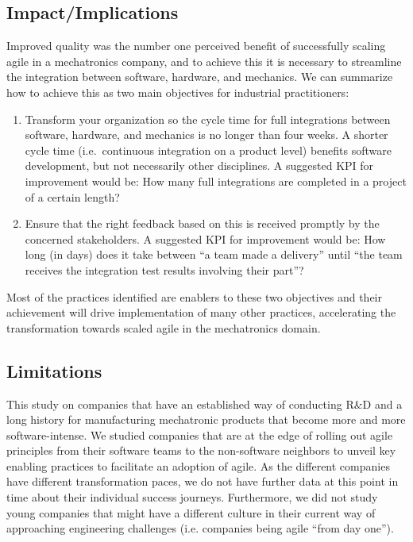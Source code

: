 \documentclass[10pt,a4paper]{IEEEtran} %
\begin{document}
\subsection{Impact/Implications}

Improved quality was the number one perceived benefit of successfully scaling agile
in a mechatronics company, and to achieve this it is necessary to streamline the
integration between software, hardware, and mechanics. We can summarize how to achieve
this as two main objectives for industrial practitioners:

\begin{enumerate}
\item Transform your organization so the cycle time for full integrations between software, hardware, and mechanics is no longer than four weeks. A shorter cycle time (i.e.~continuous integration on a product level) benefits software development, but not necessarily other disciplines. A suggested KPI for improvement would be: How many full integrations are completed in a project of a certain length?

\item Ensure that the right feedback based on this is received promptly by the concerned stakeholders. A suggested KPI for improvement would be: How long (in days) does it take between ``a team made a delivery'' until ``the team receives the integration test results involving their part''?
\end{enumerate}

Most of the practices identified are enablers to these two objectives and their achievement will drive implementation of many other practices, accelerating the transformation towards scaled agile in the mechatronics domain.

\subsection{Limitations}

This study on companies that have an established way of conducting R\&D and a long history for manufacturing mechatronic products that become more and more software-intense.
We studied companies that are at the edge of rolling out agile principles from their software teams to the non-software neighbors to unveil key enabling practices to facilitate an adoption of agile. As the different companies have different transformation paces, we do not have further data at this point in time about their individual success journeys. Furthermore, we did not study young companies that might have a different culture in their current way of approaching engineering challenges (i.e. companies being agile ``from day one'').
\end{document}
